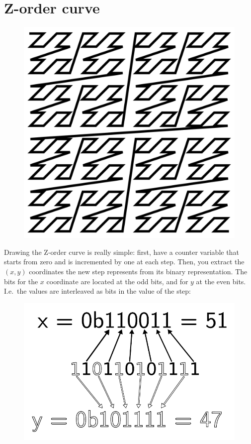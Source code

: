 \documentclass[12pt,openany,a4,usenames,dvipsnames]{book}
\begin{document}
\section{Z-order curve}
\begin{figure}[H]
  \centering
  \includegraphics[width=\textwidth,keepaspectratio]{figures/Zordercurve.pdf}
\end{figure}
Drawing the Z-order curve is really simple: first, have a counter variable that starts from zero and is incremented by one at each step. Then, you extract the $(x, y)$ coordinates the new step represents from its binary representation. The bits for the $x$ coordinate are located at the odd bits, and for $y$ at the even bits. I.e.\ the values are interleaved as bits in the value of the step:
\begin{figure}[H]
  \centering
  \includegraphics[width=\textwidth,keepaspectratio]{figures/zcurvebits.pdf}
\end{figure}
\end{document}
